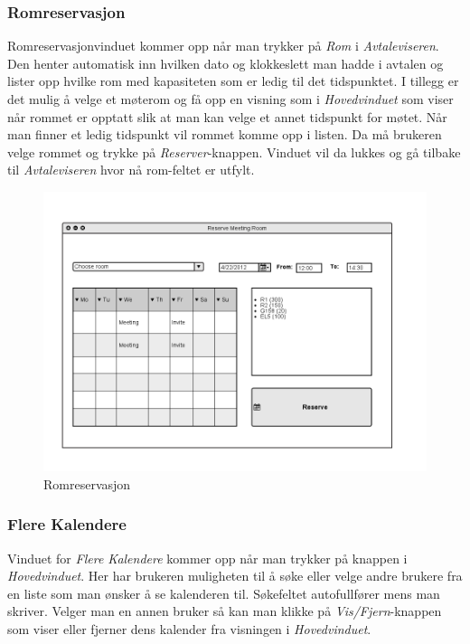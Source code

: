 \subsubsection{Romreservasjon}
Romreservasjonvinduet kommer opp når man trykker på \emph{Rom} i \emph{Avtaleviseren}. Den henter automatisk inn hvilken dato og klokkeslett man hadde i avtalen og lister opp hvilke rom med kapasiteten som er ledig til det tidspunktet. I tillegg er det mulig å velge et møterom og få opp en visning som i \emph{Hovedvinduet} som viser når rommet er opptatt slik at man kan velge et annet tidspunkt for møtet. Når man finner et ledig tidspunkt vil rommet komme opp i listen. Da må brukeren velge rommet og trykke på \emph{Reserver}-knappen. Vinduet vil da lukkes og gå tilbake til \emph{Avtaleviseren} hvor nå rom-feltet er utfylt.

\begin{figure}[H]
\centering
\includegraphics[scale=0.65]{images/romreservasjon.png}
\caption{Romreservasjon}
\label{romreservasjon_image}
\end{figure}

\subsubsection{Flere Kalendere}
Vinduet for \emph{Flere Kalendere} kommer opp når man trykker på knappen i \emph{Hovedvinduet}. Her har brukeren muligheten til å søke eller velge andre brukere fra en liste som man ønsker å se kalenderen til. Søkefeltet autofullfører mens man skriver. Velger man en annen bruker så kan man klikke på \emph{Vis/Fjern}-knappen som viser eller fjerner dens kalender fra visningen i \emph{Hovedvinduet}.

